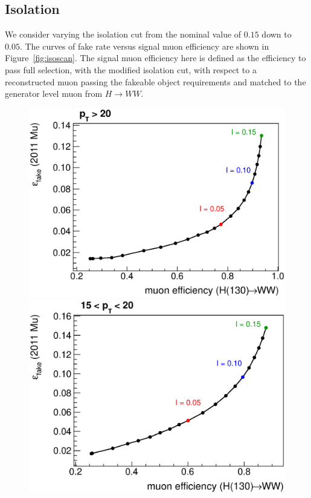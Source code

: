 \subsection{Isolation}
We consider varying the isolation cut from the nominal value of $0.15$ down to $0.05$. The curves of fake rate versus signal muon efficiency are shown in Figure~\ref{fig:isoscan}. The signal muon efficiency here is defined as the efficiency to pass full selection, with the modified isolation cut, with respect to a reconstructed muon passing the fakeable object requirements and matched to the generator level muon from $H\rightarrow WW$.

\begin{figure}[!htbp]
\begin{center}
\includegraphics[scale=0.4]{figures/isoscan0.eps}
\includegraphics[scale=0.4]{figures/isoscan1.eps}

\end{center}
\end{figure}

